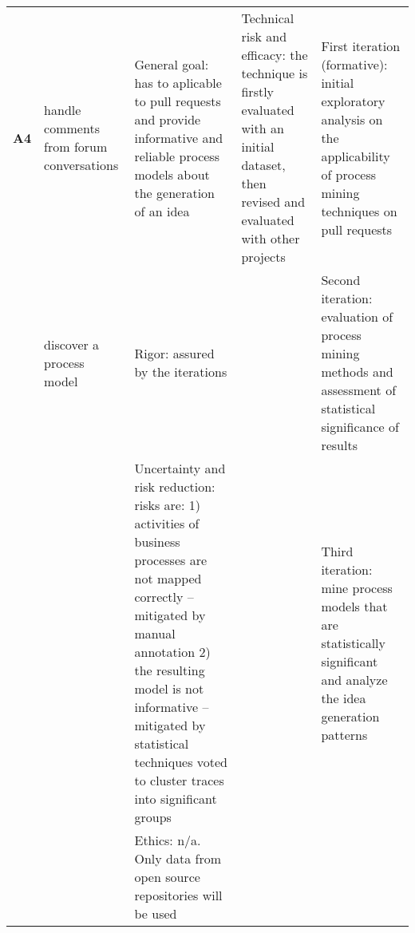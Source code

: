 \begin{longtable}[c]{@{}p{1cm}p{2.5cm}p{5cm}p{3cm}p{4cm}@{}}
\textbf{A4}       & handle comments from forum conversations       & General goal: has to aplicable to pull requests and provide informative and reliable process models about the generation of an idea                                                                                                                                      & Technical risk and efficacy: the technique is firstly evaluated with an initial dataset, then revised and evaluated with other projects              & First iteration (formative): initial exploratory analysis on the applicability of process mining techniques on pull requests  \\
                  & discover a process model                       & Rigor: assured by the iterations                                                                                                                                                                                                                                         &                                                                                                                                                      & Second iteration: evaluation of process mining methods and assessment of statistical significance of results                  \\
                  &                                                & Uncertainty and risk reduction: risks are: 1) activities of business processes are not mapped correctly – mitigated by manual annotation 2) the resulting model is not informative – mitigated by statistical techniques voted to cluster traces into significant groups &                                                                                                                                                      & Third iteration: mine process models that are statistically significant and analyze the idea generation patterns              \\
                  &                                                & Ethics: n/a. Only data from open source repositories will be used                                                                                                                                                                                                        &                                                                                                                                                      &                                                                                                                               \\

\end{longtable}
